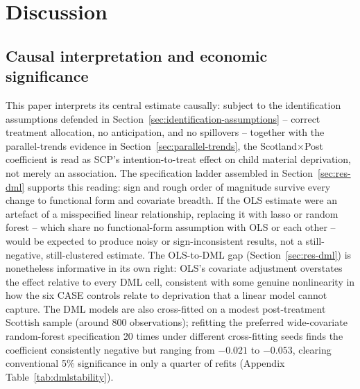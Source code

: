 \section{Discussion}
\label{sec:discussion}
 
\subsection{Causal interpretation and economic significance}
\label{sec:disc-causal}
 
This paper interprets its central estimate causally: subject to the identification assumptions defended in Section~\ref{sec:identification-assumptions} -- correct treatment allocation, no anticipation, and no spillovers -- together with the parallel-trends evidence in Section~\ref{sec:parallel-trends}, the Scotland$\times$Post coefficient is read as SCP's intention-to-treat effect on child material deprivation, not merely an association. The specification ladder assembled in Section~\ref{sec:res-dml} supports this reading: sign and rough order of magnitude survive every change to functional form and covariate breadth. If the OLS estimate were an artefact of a misspecified linear relationship, replacing it with lasso or random forest -- which share no functional-form assumption with OLS or each other -- would be expected to produce noisy or sign-inconsistent results, not a still-negative, still-clustered estimate. The OLS-to-DML gap (Section~\ref{sec:res-dml}) is nonetheless informative in its own right: OLS's covariate adjustment overstates the effect relative to every DML cell, consistent with some genuine nonlinearity in how the six CASE controls relate to deprivation that a linear model cannot capture. The DML models are also cross-fitted on a modest post-treatment Scottish sample (around 800 observations); refitting the preferred wide-covariate random-forest specification 20 times under different cross-fitting seeds finds the coefficient consistently negative but ranging from $-0.021$ to $-0.053$, clearing conventional 5\% significance in only a quarter of refits (Appendix Table~\ref{tab:dmlstability}).
 
